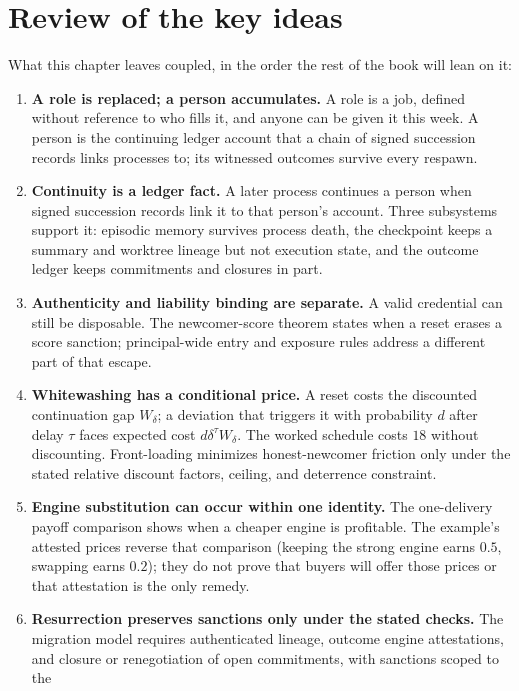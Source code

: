 \documentclass[11pt,a4paper]{article}
\theoremstyle{definition}
\begin{document}
\section*{Review of the key ideas}

What this chapter leaves coupled, in the order the rest of the book will lean on it:

\begin{enumerate}[leftmargin=1.6em,itemsep=2pt]
\item \textbf{A role is replaced; a person accumulates.} A role is a job, defined without reference to who fills it, and anyone can be given it this week. A person is the continuing ledger account that a chain of signed succession records links processes to; its witnessed outcomes survive every respawn.
\item \textbf{Continuity is a ledger fact.} A later process continues a person when signed succession records link it to that person's account. Three subsystems support it: episodic memory survives process death, the checkpoint keeps a summary and worktree lineage but not execution state, and the outcome ledger keeps commitments and closures in part.
\item \textbf{Authenticity and liability binding are separate.} A valid credential
can still be disposable. The newcomer-score theorem states when a reset erases
a score sanction; principal-wide entry and exposure rules address a
different part of that escape.
\item \textbf{Whitewashing has a conditional price.} A reset costs the discounted continuation gap $W_\delta$; a deviation that triggers it with probability $d$ after delay $\tau$ faces expected cost $d\delta^\tau W_\delta$. The worked schedule costs $18$ without discounting. Front-loading minimizes honest-newcomer friction only under the stated relative discount factors, ceiling, and deterrence constraint.
\item \textbf{Engine substitution can occur within one identity.} The one-delivery
payoff comparison shows when a cheaper engine is profitable. The example's
attested prices reverse that comparison (keeping the strong engine earns $0.5$, swapping earns $0.2$); they do not prove
that buyers will offer those prices or that attestation is the only remedy.
\item \textbf{Resurrection preserves sanctions only under the stated checks.}
The migration model requires authenticated lineage, outcome engine attestations,
and closure or renegotiation of open commitments, with sanctions scoped to the

\end{enumerate}
\end{document}

